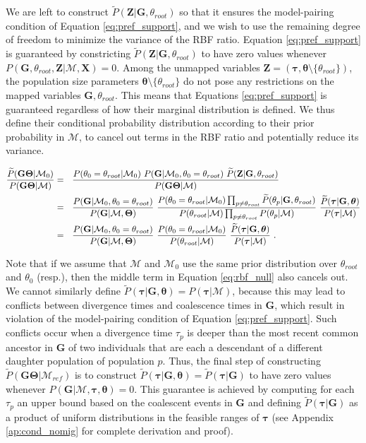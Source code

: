 \documentclass[11pt]{article}
\newcommand{\vect}[1]{\boldsymbol{\mathbf{#1}}}
\newcommand{\X}{\vect{X}}
\newcommand{\M}{\mathcal{M}}
\newcommand{\G}{\vect{G}}
\newcommand{\T}{\vect{\Theta}}
\newcommand{\GT}{\G\T}
\newcommand{\Mref}{\M_{ref}}
\newcommand{\Pref}{\widetilde{P}}
\newcommand{\1}{\mathbbm{1}}
\newcommand{\Z}{\vect{Z}}
\newcommand{\troot}{\theta_{root}}
\newcommand{\taus}{\vect\tau}
\newcommand{\thetas}{\vect\theta}
\begin{document}
We are left to construct $\Pref(\Z|\G,\troot)$ so that it ensures the model-pairing condition of Equation \ref{eq:pref_support},
and we wish to use the remaining degree of freedom to minimize the variance of the RBF ratio.
%
Equation \ref{eq:pref_support} is guaranteed by constricting $\Pref(\Z|\G,\troot)$ to have zero values whenever $P(\G,\troot,\Z|\M,\X)=0$.
%
Among the unmapped variables $\Z=(\taus,\thetas\setminus \{\troot\})$, the population size parameters $\thetas\setminus \{\troot\}$ do not 
pose any restrictions on the mapped variables $\G,\troot$. This means that Equations \ref{eq:pref_support} is guaranteed regardless of how their marginal distribution is defined.
%
We thus define their conditional probability distribution according to their prior probability in $\M$, to cancel out terms in the RBF ratio and potentially reduce its variance.
%
\begin{small}
\begin{align}
\frac{\Pref(\GT|\M_0) }{P(\GT|\M)}
&=~~ \frac{ P(\theta_0=\troot|\M_0) ~ P(\G|\M_0,\theta_0=\troot) ~ \Pref(\Z|\G,\troot)} {P(\GT|\M)} \notag \\
&=~~ \frac{ P(\G|\M_0,\theta_0=\troot) }{ P(\G|\M,\T)}~ 
     \frac{ P(\theta_0=\troot|\M_0) \prod_{p\neq \troot}\Pref(\theta_p|\G,\troot) }{P(\troot|\M)\prod_{p\neq \troot}P(\theta_p|\M)}~
     \frac{ \Pref(\taus|\G,\thetas)}{P(\taus|\M)} \notag \\
&=~~ \frac{ P(\G|\M_0,\theta_0=\troot) }{ P(\G|\M,\T)}~ 
     \frac{ P(\theta_0=\troot|\M_0)}{P(\troot|\M)}\
     \frac{ \Pref(\taus|\G,\thetas)}{P(\taus|\M)} ~. \label{eq:rbf_null}
\end{align}
\end{small}

Note that if we assume that $\M$ and $\M_0$ use the same prior distribution over $\theta_{root}$ and $\theta_0$ (resp.),
then the middle term in Equation \ref{eq:rbf_null} also cancels out.
%
We cannot similarly define $\Pref(\taus|\G,\thetas)=P(\taus|\M)$, because this may lead to conflicts between divergence times and coalescence times in $\G$, which result in violation of
the model-pairing condition of Equation \ref{eq:pref_support}.
%
Such conflicts occur when a divergence time $\tau_p$ is deeper than the most recent common ancestor
in $\G$ of two individuals that are each a descendant of a different daughter population of population $p$.
%
%
Thus, the final step of constructing $\Pref(\GT|\Mref)$ is to construct $\Pref(\taus|\G,\thetas)=\Pref(\taus|\G)$ to have zero values whenever $P(\G|\M,\taus,\thetas)=0$.
%
This guarantee is achieved by computing for each $\tau_p$ an upper bound based on the coalescent events in $\G$
and defining $\Pref(\taus|\G)$ as a product of uniform distributions in the feasible ranges of $\taus$
%
(see  Appendix \ref{ap:cond_nomig} for complete derivation and proof).
\end{document}
